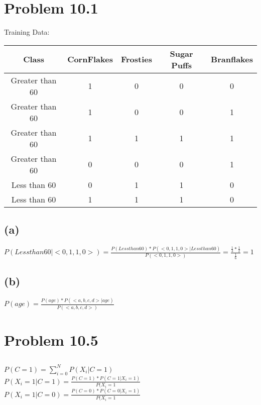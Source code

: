 \documentclass{article}
\begin{document}
\section{Problem 10.1}

Training Data:\\

\begin{tabular}{c|cccc}

  Class & CornFlakes & Frosties & Sugar Puffs & Branflakes \\
  \hline
  Greater than 60 & 1 & 0 & 0 & 0\\
  Greater than 60 & 1 & 0 & 0 & 1\\
  Greater than 60 & 1 & 1 & 1 & 1\\
  Greater than 60 & 0 & 0 & 0 & 1\\
  Less than 60 & 0 & 1 & 1 & 0\\
  Less than 60 & 1 & 1 & 1 & 0\\
  

\end{tabular}

\subsection{(a)}

$P(Less than 60 | <0,1,1,0>) = \frac{P(Less than 60) * P(<0,1,1,0>|Less than 60)}{P(<0,1,1,0>)} = \frac{\frac{1}{3} * \frac{1}{2}}{\frac{1}{6}} = 1$

\subsection{(b)}

$P(age) = \frac{ P(age) * P(<a,b,c,d> | age) }{ P(<a,b,c,d>) }$

\section{Problem 10.5}

\subsection{}

$P(C=1) = \sum_{i=0}^N P(X_i | C=1)$ \\


$P(X_i = 1 | C = 1) = \frac{P(C=1) * P(C=1 | X_i=1) }{P(X_i = 1}$ \\


$P(X_i=1 | C = 0) =  \frac{P(C=0) * P(C=0 | X_i=1) }{P(X_i = 1}$ \\
\end{document}
